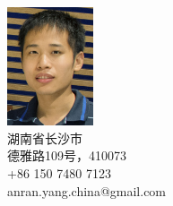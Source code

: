 \begin{nospace}\begin{flushright}
\vspace{-2.7em}
\includegraphics[width=1in]{photo.jpg}\\
湖南省长沙市
\\
德雅路109号，410073
\\
+86 150 7480 7123
\\
anran.yang.china@gmail.com
\\
\end{flushright}\end{nospace}

